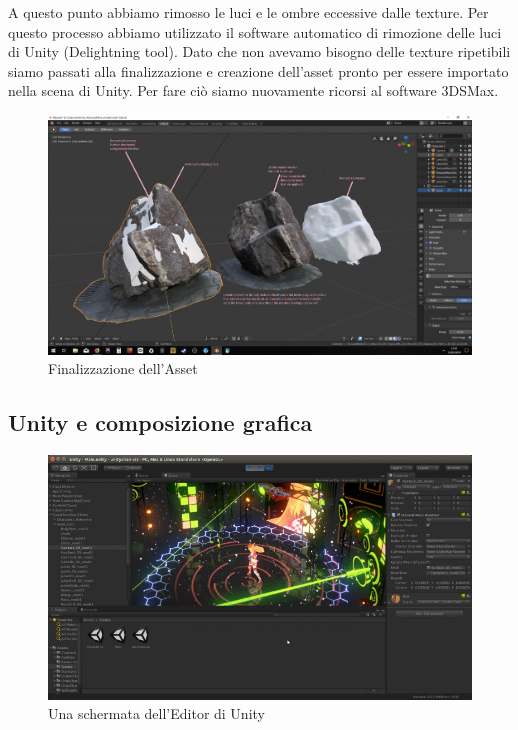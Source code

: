 \documentclass[12pt]{report}
\begin{document}
A questo punto abbiamo rimosso le luci e le ombre eccessive dalle texture. Per questo processo abbiamo utilizzato il software automatico di rimozione delle luci di Unity (Delightning tool). Dato che non avevamo bisogno delle texture ripetibili siamo passati alla finalizzazione e creazione dell'asset pronto per essere importato nella scena di Unity. Per fare ci\`o siamo nuovamente ricorsi al software 3DSMax.

\begin{figure}[H]
    \centering
    \includegraphics[width = \linewidth]{img/3dsmax_1.png}
    \caption{Finalizzazione dell'Asset}
\end{figure}

\newpage
\subsection{Unity e composizione grafica}
\begin{figure}[H]
    \centering
    \includegraphics[width = \linewidth]{img/unity-3d-linux.jpg}
    \caption{Una schermata dell'Editor di Unity}
\end{figure}
\end{document}
